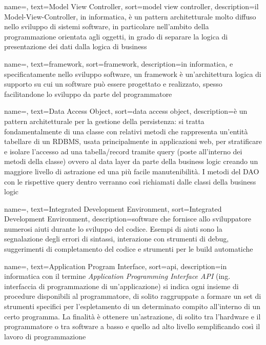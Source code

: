 {
    name=,
    text=Model View Controller,
    sort=model view controller,
    description={il Model-View-Controller, in informatica, è un pattern architetturale molto diffuso nello sviluppo di sistemi software, in particolare nell’ambito della programmazione orientata agli oggetti, in grado di separare la logica di presentazione dei dati dalla logica di business}
}

{
    name=,
    text=framework,
    sort=framework,
    description={in informatica, e specificatamente nello sviluppo software, un framework è un’architettura logica di supporto su cui un software può essere progettato e realizzato, spesso facilitandone lo sviluppo da parte del programmatore}
}

{
    name=,
    text=Data Access Object,
    sort=data access object,
    description={è un pattern architetturale per la gestione della persistenza: si tratta fondamentalmente di una classe con relativi metodi che rappresenta un’entità tabellare di un RDBMS, usata principalmente in applicazioni web, per stratificare e isolare l’accesso ad una tabella/record tramite query (poste all’interno dei metodi della classe) ovvero al data layer da parte della business logic creando un maggiore livello di astrazione ed una più facile manutenibilità. I metodi del DAO con le rispettive query dentro verranno così richiamati dalle classi della business logic}
}

{
    name=,
    text=Integrated Development Environment,
    sort=Integrated Development Environment,
    description={software che fornisce allo sviluppatore numerosi aiuti durante lo sviluppo del codice. Esempi di aiuti sono la segnalazione degli errori di sintassi, interazione con strumenti di debug, suggerimenti di completamento del codice e strumenti per le build automatiche}
}

{
    name=,
    text=Application Program Interface,
    sort=api,
    description={in informatica con il termine \emph{Application Programming Interface API} (ing. interfaccia di programmazione di un'applicazione) si indica ogni insieme di procedure disponibili al programmatore, di solito raggruppate a formare un set di strumenti specifici per l'espletamento di un determinato compito all'interno di un certo programma. La finalità è ottenere un'astrazione, di solito tra l'hardware e il programmatore o tra software a basso e quello ad alto livello semplificando così il lavoro di programmazione}
}


